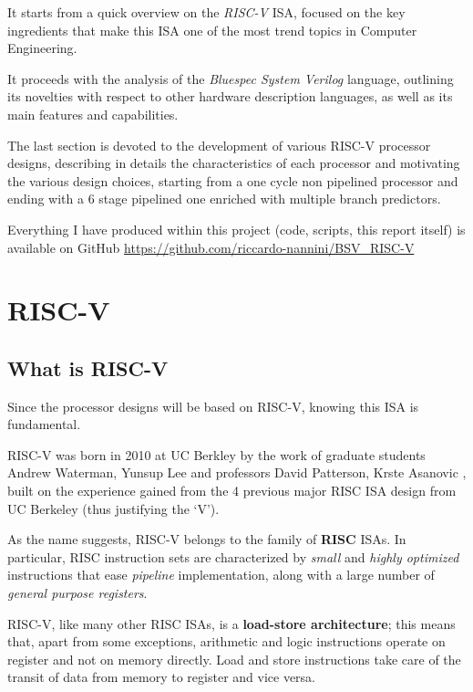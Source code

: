 \documentclass[12pt,oneside,a4paper]{article}
\begin{document}
It starts from a quick overview on the \textit{RISC-V} ISA, focused on the key ingredients that make this ISA one of the most trend topics in Computer Engineering.

It proceeds with the analysis of the \textit{Bluespec System Verilog} language, outlining its novelties with respect to other hardware description languages, as well as its main features and capabilities. 

The last section is devoted to the development of various RISC-V processor designs, describing in details the characteristics of each processor and motivating the various design choices, starting from a one cycle non pipelined processor and ending with a 6 stage pipelined one enriched with multiple branch predictors.

Everything I have produced within this project (code, scripts, this report itself) is available on GitHub \url{https://github.com/riccardo-nannini/BSV_RISC-V}


\section{RISC-V} \label{sec:risc-v}
\subsection{What is RISC-V}
Since the processor designs will be based on RISC-V, knowing this ISA is fundamental.

RISC-V was born in 2010 at UC Berkley by the work of graduate students Andrew Waterman, Yunsup Lee and professors David Patterson, Krste Asanovic \cite{risc-v_original}, built on the experience gained from the 4 previous major RISC ISA design from UC Berkeley (thus justifying the ‘V’).

As the name suggests, RISC-V belongs to the family of \textbf{RISC} ISAs. In particular, RISC instruction sets are characterized by \textit{small} and \textit{highly optimized} instructions that ease \textit{pipeline} implementation, along with a large number of \textit{general purpose registers}. 

RISC-V, like many other RISC ISAs, is a \textbf{load-store architecture}; this means that, apart from some exceptions, arithmetic and logic instructions operate on register and not on memory directly. Load and store instructions take care of the transit of data from memory to register and vice versa.
\end{document}
